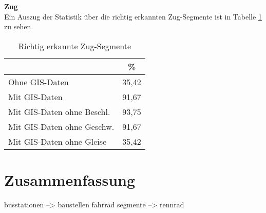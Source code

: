 \textbf{Zug} \\
Ein Auszug der Statistik über die richtig erkannten Zug-Segmente ist in Tabelle \ref{result-train} zu sehen.

\begin{table}[h]
\centering
\begin{tabular}{|l|c|}
\hline
 & \% \\ \hline
Ohne GIS-Daten & 35,42 \\ \hline
Mit GIS-Daten & 91,67 \\ \hline
Mit GIS-Daten ohne Beschl. & 93,75 \\ \hline
Mit GIS-Daten ohne Geschw. & 91,67 \\ \hline
Mit GIS-Daten ohne Gleise & 35,42 \\ \hline
\end{tabular}
\caption{Richtig erkannte Zug-Segmente}
\label{result-train}
\end{table}

\section{Zusammenfassung}
busstationen --> baustellen
fahrrad segmente --> rennrad